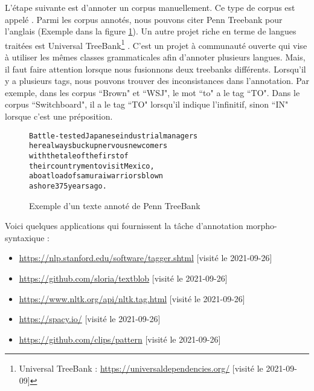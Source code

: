 \documentclass{KodeBook}
\begin{document}
L'étape suivante est d'annoter un corpus manuellement. 
Ce type de corpus est appelé .
Parmi les corpus annotés, nous pouvons citer Penn Treebank pour l'anglais (Exemple dans la figure \ref{fig:penn-exp}).
Un autre projet riche en terme de langues traitées est Universal TreeBank\footnote{Universal TreeBank : \url{https://universaldependencies.org/} [visité le 2021-09-09]} \cite{2012-petrov-al}. 
C'est un projet à communauté ouverte qui vise à utiliser les mêmes classes grammaticales afin d'annoter plusieurs langues. 
Mais, il faut faire attention lorsque nous fusionnons deux treebanks différents. 
Lorsqu'il y a plusieurs tags, nous pouvons trouver des inconsistances dans l'annotation.
Par exemple, dans les corpus ``Brown" et ``WSJ", le mot ``to" a le tag ``TO". 
Dans le corpus ``Switchboard", il a le tag ``TO" lorsqu'il indique l'infinitif, sinon ``IN" lorsque c'est une préposition.
%
\begin{figure}
	\centering
	\begin{tcolorbox}[boxrule=0.4pt,text width=.7\textwidth]
		\footnotesize
		\begin{alltt}
			Battle-tested Japanese industrial managers
			here always buck up nervous newcomers
			with the tale of the first of
			their countrymen to visit Mexico ,\keyword{/,}
			a boatload of samurai warriors blown
			ashore 375 years ago .
		\end{alltt}
	\end{tcolorbox}
	\caption[Exemple d'un texte annoté de Penn TreeBank]{Exemple d'un texte annoté de Penn TreeBank \cite{2003-taylor}\label{fig:penn-exp}}
\end{figure}

Voici quelques applications qui fournissent la tâche d'annotation morpho-syntaxique :
\begin{itemize}
	\item \url{https://nlp.stanford.edu/software/tagger.shtml} [visité le 2021-09-26]
	\item \url{https://github.com/sloria/textblob} [visité le 2021-09-26]
	\item \url{https://www.nltk.org/api/nltk.tag.html} [visité le 2021-09-26]
	\item \url{https://spacy.io/} [visité le 2021-09-26]
	\item \url{https://github.com/clips/pattern} [visité le 2021-09-26]
\end{itemize}
\end{document}
